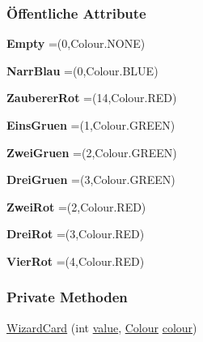 \subsubsection*{Öffentliche Attribute}
\begin{DoxyCompactItemize}
\item 
\hypertarget{a00070_ac3e3346bc6f9bb504e43495424c91a51}{{\bfseries Empty} =(0,Colour.\-N\-O\-N\-E)}\label{a00070_ac3e3346bc6f9bb504e43495424c91a51}

\item 
\hypertarget{a00070_a9e2032170c21369a7995486b0f36c625}{{\bfseries Narr\-Blau} =(0,Colour.\-B\-L\-U\-E)}\label{a00070_a9e2032170c21369a7995486b0f36c625}

\item 
\hypertarget{a00070_a252997a22b09fa77ef794a0df07248b1}{{\bfseries Zauberer\-Rot} =(14,Colour.\-R\-E\-D)}\label{a00070_a252997a22b09fa77ef794a0df07248b1}

\item 
\hypertarget{a00070_ac4cd3f5901b64e692e2b5fd2f51ebc88}{{\bfseries Eins\-Gruen} =(1,Colour.\-G\-R\-E\-E\-N)}\label{a00070_ac4cd3f5901b64e692e2b5fd2f51ebc88}

\item 
\hypertarget{a00070_acb0c4ea80aa91bff26e7c360911f0169}{{\bfseries Zwei\-Gruen} =(2,Colour.\-G\-R\-E\-E\-N)}\label{a00070_acb0c4ea80aa91bff26e7c360911f0169}

\item 
\hypertarget{a00070_aad2e90597f9bbbfbe7e9007d95b31f9a}{{\bfseries Drei\-Gruen} =(3,Colour.\-G\-R\-E\-E\-N)}\label{a00070_aad2e90597f9bbbfbe7e9007d95b31f9a}

\item 
\hypertarget{a00070_ac71a4ec4946c1286e38145d2f488a0f3}{{\bfseries Zwei\-Rot} =(2,Colour.\-R\-E\-D)}\label{a00070_ac71a4ec4946c1286e38145d2f488a0f3}

\item 
\hypertarget{a00070_a7af94abed4f8f437618fe5b9788e284a}{{\bfseries Drei\-Rot} =(3,Colour.\-R\-E\-D)}\label{a00070_a7af94abed4f8f437618fe5b9788e284a}

\item 
\hypertarget{a00070_a0f0c041275b9e5d96a4c8cbfb8d90189}{{\bfseries Vier\-Rot} =(4,Colour.\-R\-E\-D)}\label{a00070_a0f0c041275b9e5d96a4c8cbfb8d90189}

\end{DoxyCompactItemize}
\subsubsection*{Private Methoden}
\begin{DoxyCompactItemize}
\item 
\hyperlink{a00070_a8fe9471a90a24b78a96705fcbe13cd5d}{Wizard\-Card} (int \hyperlink{a00070_a899c1b74df7f8fda2fcd2c85d9185da8}{value}, \hyperlink{a00058}{Colour} \hyperlink{a00070_ad8b08a076fe1a8affe777f3f33ed8d15}{colour})
\end{DoxyCompactItemize}

